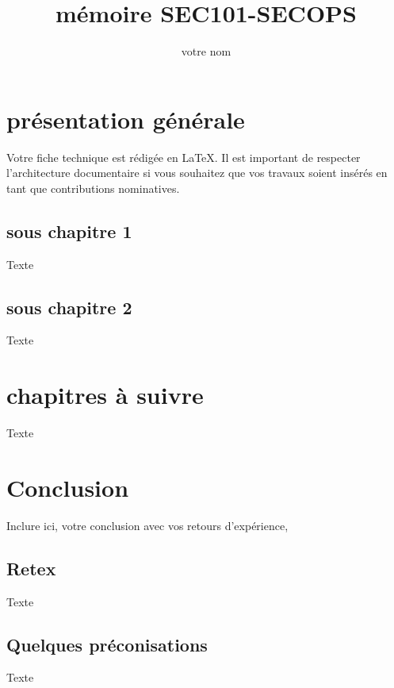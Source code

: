 \documentclass[11pt,fleqn,twoside]{article}
\author{votre nom}
\title{mémoire SEC101-SECOPS}
\begin{document}
\maketitle
\uelogo

\section{présentation générale}
Votre fiche technique est rédigée en \LaTeX. Il est important de respecter l'architecture documentaire si vous souhaitez que vos travaux soient insérés en tant que contributions nominatives.
\subsection{sous chapitre 1}
Texte
\subsection{sous chapitre 2}
Texte
\section{chapitres à suivre }
Texte 
\section{Conclusion}
Inclure ici, votre conclusion avec vos retours d'expérience, 
\subsection{Retex}
Texte
\subsection{Quelques préconisations}
Texte
\end{document}
